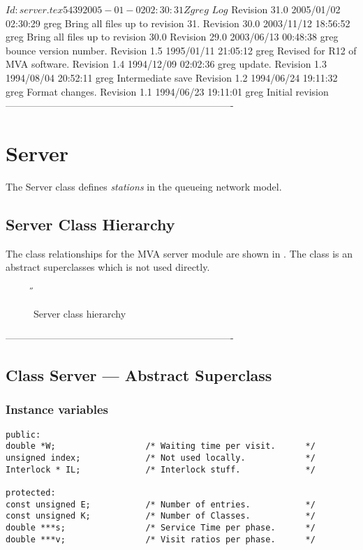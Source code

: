 \C 
\C $Id: server.tex 5439 2005-01-02 02:30:31Z greg $
\C 
\C $Log$
\C Revision 31.0  2005/01/02 02:30:29  greg
\C Bring all files up to revision 31.
\C
\C Revision 30.0  2003/11/12 18:56:52  greg
\C Bring all files up to revision 30.0
\C
\C Revision 29.0  2003/06/13 00:48:38  greg
\C bounce version number.
\C
\C Revision 1.5  1995/01/11 21:05:12  greg
\C Revised for R12 of MVA software.
\C
\C Revision 1.4  1994/12/09  02:02:36  greg
\C update.
\C
\C Revision 1.3  1994/08/04  20:52:11  greg
\C Intermediate save
\C
\C Revision 1.2  1994/06/24  19:11:32  greg
\C Format changes.
\C
\C Revision 1.1  1994/06/23  19:11:01  greg
\C Initial revision
\C
\C ----------------------------------------------------------------------
\section{Server}
\label{sec:server}

The Server class defines {\em stations\/} in the queueing network
model.  


\subsection{Server Class Hierarchy}
\label{sec:server-hierarchy}

The class relationships for the MVA server module are shown in
.  The class
 is an abstract superclasses which is not used directly.

\begin{figure}[htbp]
  \label{fig:server}
  \begin{center}
    \T \tex \leavevmode 
    \caption{Server class hierarchy}
    \H {}
  \end{center}
\end{figure}

\htmlrule
\C
\C ----------------------------------------------------------------------
\C
\subsection{Class Server  --- Abstract Superclass}
\subsubsection{Instance variables}
\label{sec:server-ivars}

\begin{verbatim}
public:
double *W;                  /* Waiting time per visit.      */
unsigned index;             /* Not used locally.            */
Interlock * IL;             /* Interlock stuff.             */

protected:             
const unsigned E;           /* Number of entries.           */
const unsigned K;           /* Number of Classes.           */
double ***s;                /* Service Time per phase.      */
double ***v;                /* Visit ratios per phase.      */
\end{verbatim}

